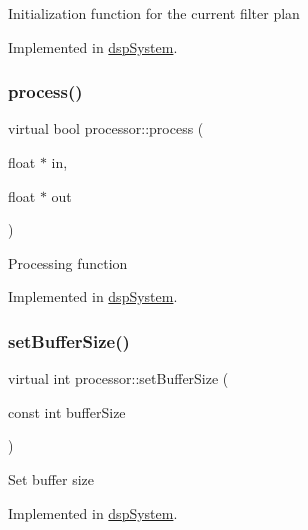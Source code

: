 Initialization function for the current filter plan 

Implemented in \hyperlink{classdspSystem_a57676105878d826fe28c9faf9bd83c3e}{dsp\+System}.

\mbox{\label{classprocessor_a208b7490862424d1a487aa31b3520116}} 
\subsubsection{\texorpdfstring{process()}{process()}}
{\footnotesize\ttfamily virtual bool processor\+::process (\begin{DoxyParamCaption}\item[{float $\ast$}]{in,  }\item[{float $\ast$}]{out }\end{DoxyParamCaption})\hspace{0.3cm}{\ttfamily [pure virtual]}}

Processing function 

Implemented in \hyperlink{classdspSystem_addff0f24f52320d613d7303b2a15562f}{dsp\+System}.

\mbox{\label{classprocessor_a1101feba5276acdadae9cd2d9b202421}} 
\subsubsection{\texorpdfstring{set\+Buffer\+Size()}{setBufferSize()}}
{\footnotesize\ttfamily virtual int processor\+::set\+Buffer\+Size (\begin{DoxyParamCaption}\item[{const int}]{buffer\+Size }\end{DoxyParamCaption})\hspace{0.3cm}{\ttfamily [pure virtual]}}

Set buffer size 

Implemented in \hyperlink{classdspSystem_aefaba04b05be939878a29de212c43d72}{dsp\+System}.

\mbox{\label{classprocessor_afd94390f689bf421808cd413643befcf}} 
